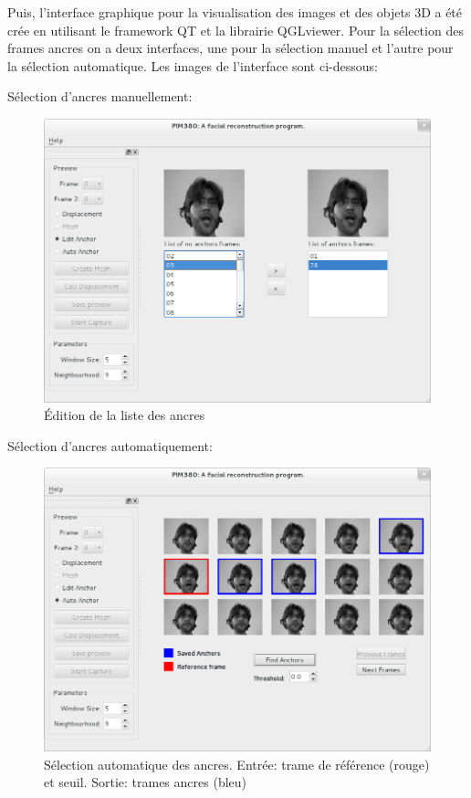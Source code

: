 \documentclass[a4paper,12pt]{article}
\begin{document}
Puis, l'interface graphique pour la visualisation des images et des
objets 3D a été crée en utilisant le framework QT et la librairie
QGLviewer. 
Pour la sélection des  frames ancres on a deux interfaces, une pour la
sélection manuel et l’autre pour la sélection automatique. Les images
de l’interface sont ci-dessous:

\newpage
Sélection d'ancres manuellement: 

\begin{figure}[ht!]
  \begin{center}
    \includegraphics[scale=0.35]{img/editAnchorList.png}
    \caption{Édition de la liste des ancres}
  \end{center}
\end{figure}

Sélection d'ancres automatiquement:

\begin{figure}[ht!]
  \begin{center}
    \includegraphics[scale=0.35]{img/AnchorAutomaticSelection.png}
    \caption{Sélection automatique des ancres. Entrée: trame de référence (rouge) et seuil. Sortie: trames ancres (bleu)}
  \end{center}
\end{figure}
\end{document}

